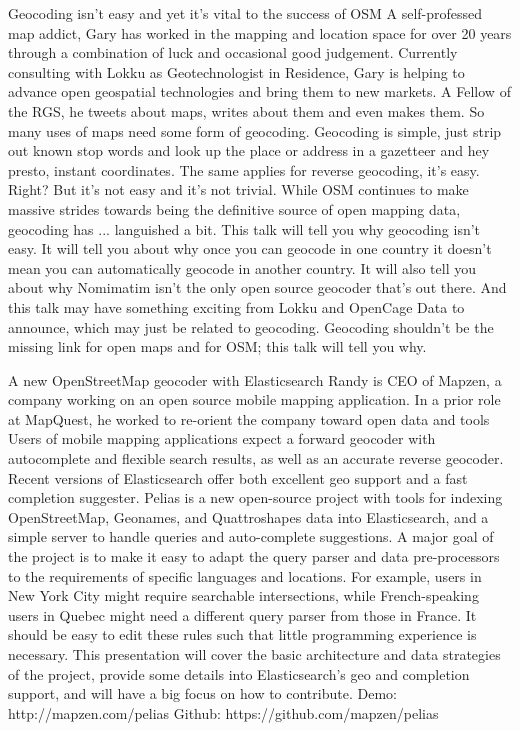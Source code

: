 %
{Geocoding isn't easy and yet it's vital to the success of OSM}%
{A self-professed map addict, Gary has worked in the mapping and location space for over 20 years through a combination of luck and occasional good judgement. Currently consulting with Lokku as Geotechnologist in Residence, Gary is helping to advance open geospatial technologies and bring them to new markets. A Fellow of the RGS, he tweets about maps, writes about them and even makes them. }%
{So many uses of maps need some form of geocoding. Geocoding is simple, just strip out known stop words and look up the place or address in a gazetteer and hey presto, instant coordinates. The same applies for reverse geocoding, it's easy. Right? But it's not easy and it's not trivial. While OSM continues to make massive strides towards being the definitive source of open mapping data, geocoding has ... languished a bit. This talk will tell you why geocoding isn't easy. It will tell you about why once you can geocode in one country it doesn't mean you can automatically geocode in another country. It will also tell you about why Nomimatim isn't the only open source geocoder that's out there. And this talk may have something exciting from Lokku and OpenCage Data to announce, which may just be related to geocoding. Geocoding shouldn't be the missing link for open maps and for OSM; this talk will tell you why. }

%
{A new OpenStreetMap geocoder with Elasticsearch}%
{Randy is CEO of Mapzen, a company working on an open source mobile mapping application. In a prior role at MapQuest, he worked to re-orient the company toward open data and tools}%
{Users of mobile mapping applications expect a forward geocoder with autocomplete and flexible search results, as well as an accurate reverse geocoder. Recent versions of Elasticsearch offer both excellent geo support and a fast completion suggester. Pelias is a new open-source project with tools for indexing OpenStreetMap, Geonames, and Quattroshapes data into Elasticsearch, and a simple server to handle queries and auto-complete suggestions. A major goal of the project is to make it easy to adapt the query parser and data pre-processors to the requirements of specific languages and locations. For example, users in New York City might require searchable intersections, while French-speaking users in Quebec might need a different query parser from those in France. It should be easy to edit these rules such that little programming experience is necessary. This presentation will cover the basic architecture and data strategies of the project, provide some details into Elasticsearch's geo and completion support, and will have a big focus on how to contribute. Demo: http://mapzen.com/pelias Github: https://github.com/mapzen/pelias}


